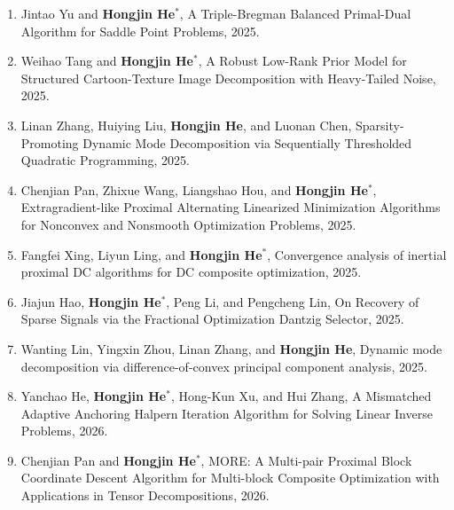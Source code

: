 
\begin{enumerate}
\item Jintao Yu and {\bf Hongjin He}$^*$, A Triple-Bregman Balanced Primal-Dual Algorithm for Saddle Point Problems, 2025.
\item Weihao Tang and {\bf Hongjin He}$^*$, A Robust Low-Rank Prior Model for Structured Cartoon-Texture Image Decomposition with Heavy-Tailed Noise, 2025.
\item Linan Zhang, Huiying Liu, {\bf Hongjin He}, and Luonan Chen, Sparsity-Promoting Dynamic Mode Decomposition via Sequentially Thresholded Quadratic Programming, 2025.
\item Chenjian Pan, Zhixue Wang, Liangshao Hou, and {\bf Hongjin He}$^*$, Extragradient-like Proximal Alternating Linearized Minimization Algorithms for Nonconvex and Nonsmooth Optimization Problems, 2025.
\item Fangfei Xing, Liyun Ling, and {\bf Hongjin He}$^*$, Convergence analysis of inertial proximal DC algorithms for DC composite optimization, 2025.
\item Jiajun Hao, {\bf Hongjin He}$^*$, Peng Li, and Pengcheng Lin, On Recovery of Sparse Signals via the Fractional Optimization Dantzig Selector, 2025.
\item Wanting Lin, Yingxin Zhou, Linan Zhang, and \textbf{Hongjin He}, Dynamic mode decomposition via difference-of-convex principal component analysis, 2025.
\item Yanchao He, {\bf Hongjin He}$^*$, Hong-Kun Xu, and Hui Zhang, A Mismatched Adaptive Anchoring Halpern Iteration Algorithm for Solving Linear Inverse Problems, 2026.
\item Chenjian Pan and {\bf Hongjin He}$^*$, MORE: A Multi-pair Proximal Block Coordinate Descent Algorithm for Multi-block Composite Optimization with Applications in Tensor Decompositions, 2026.
\end{enumerate}